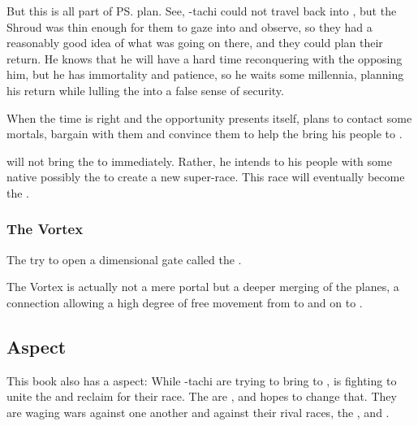 But this is all part of \ps{\Daggerrain}{} plan. See, \Daggerrain-tachi could not travel back into \Miith{}, but the Shroud was thin enough for them to gaze into \Miith{} and observe, so they had a reasonably good idea of what was going on there, and they could plan their return. He knows that he will have a hard time reconquering \Miith{} with the \dragons{} opposing him, but he has immortality and patience, so he waits some millennia, planning his return while lulling the \dragons{} into a false sense of security. 

When the time is right and the opportunity presents itself, \Daggerrain{} plans to contact some \Miithian{} mortals, bargain with them and convince them to help the \banelord{} bring his people to \Miith{}. 

\Daggerrain{} will not bring the \banes{} to \Miith{} immediately. Rather, he intends to  his people with some native \Miithians\dash possibly the \nephilim\dash to create a new super-race. This race will eventually become the . 





\subsubsection{The Vortex}
The \banes{} try to open a dimensional gate called the . 

The Vortex is actually not a mere portal but a deeper merging of the planes, a connection allowing a high degree of free movement from \Erebos{} to \Nyx{} and on to \Miith{}. 









\subsection{\Draconian{} Aspect}
This book also has a \draconian{} aspect: 
While \Semiza-tachi are trying to bring \banes{} to \Miith{}, \Nexagglachel{} is fighting to unite the \dragons{} and reclaim \Miith{} for their race. 
The \dragons{} are , and \Nexagglachel{} hopes to change that. 
They are waging wars against one another and against their rival races, the \quiljaaran, \vorcanths{} and \nagae. 





